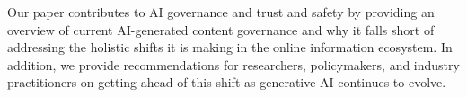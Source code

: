 Our paper contributes to AI governance and trust and safety by providing an overview of current AI-generated content governance and why it falls short of addressing the holistic shifts it is making in the online information ecosystem. In addition, we provide recommendations for researchers, policymakers, and industry practitioners on getting ahead of this shift as generative AI continues to evolve.
 

